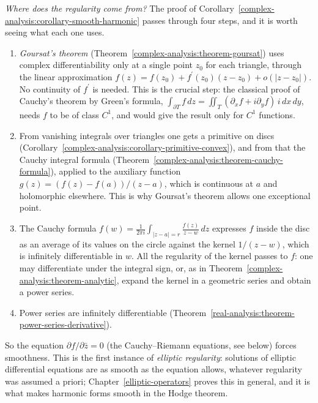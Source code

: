 \begin{remark}\label{complex-analysis:remark-regularity}
\emph{Where does the regularity come from?} The proof of Corollary~\ref{complex-analysis:corollary-smooth-harmonic} passes through four steps, and it is worth seeing what each one uses.
\begin{enumerate}
\item \emph{Goursat's theorem} (Theorem~\ref{complex-analysis:theorem-goursat}) uses complex differentiability only at a single point $z_0$ for each triangle, through the linear approximation
$f(z) = f(z_0) + f^{\prime}(z_0)(z - z_0) + o(|z - z_0|)$. No continuity of $f^{\prime}$ is needed. This is the crucial step: the classical proof of Cauchy's theorem by Green's formula,
$\int_{\partial T}f\,dz = \iint_T(\partial_xf + i\partial_yf)\,i\,dx\,dy$, needs $f$ to be of class $C^1$, and would give the result only for $C^1$ functions.
\item From vanishing integrals over triangles one gets a primitive on discs (Corollary~\ref{complex-analysis:corollary-primitive-convex}), and from that the Cauchy integral formula
(Theorem~\ref{complex-analysis:theorem-cauchy-formula}), applied to the auxiliary function $g(z) = (f(z) - f(a))/(z - a)$, which is continuous at $a$ and holomorphic elsewhere. This is why
Goursat's theorem allows one exceptional point.
\item The Cauchy formula $f(w) = \frac1{2\pi i}\int_{|z - a| = r}\frac{f(z)}{z - w}\,dz$ expresses $f$ inside the disc as an average of its values on the circle against the kernel $1/(z - w)$, which is
infinitely differentiable in $w$. All the regularity of the kernel passes to $f$: one may differentiate under the integral sign, or, as in Theorem~\ref{complex-analysis:theorem-analytic}, expand the kernel
in a geometric series and obtain a power series.
\item Power series are infinitely differentiable (Theorem~\ref{real-analysis:theorem-power-series-derivative}).
\end{enumerate}
So the equation $\partial f/\partial\bar z = 0$ (the Cauchy--Riemann equations, see below) forces smoothness. This is the first instance of \emph{elliptic regularity}: solutions of elliptic
differential equations are as smooth as the equation allows, whatever regularity was assumed a priori; Chapter~\ref{elliptic-operators} proves this in general, and it is what makes harmonic forms smooth in
the Hodge theorem.
\end{remark}

